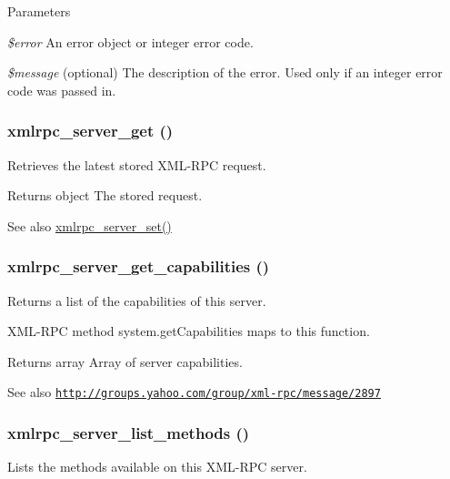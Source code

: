 \begin{DoxyParams}{Parameters}
\item[{\em \$error}]An error object or integer error code. \item[{\em \$message}](optional) The description of the error. Used only if an integer error code was passed in. \end{DoxyParams}
\hypertarget{xmlrpcs_8inc_a368b9f8580aad3b04ad06387e0042b1d}{
\subsubsection[{xmlrpc\_\-server\_\-get}]{\setlength{\rightskip}{0pt plus 5cm}xmlrpc\_\-server\_\-get ()}}
\label{xmlrpcs_8inc_a368b9f8580aad3b04ad06387e0042b1d}
Retrieves the latest stored XML-\/RPC request.

\begin{DoxyReturn}{Returns}
object The stored request.
\end{DoxyReturn}
\begin{DoxySeeAlso}{See also}
\hyperlink{xmlrpcs_8inc_a0797ab88a9029962cd404475d1dfd253}{xmlrpc\_\-server\_\-set()} 
\end{DoxySeeAlso}
\hypertarget{xmlrpcs_8inc_a4763d0e14c3c8eee618d47c8f8d7984f}{
\subsubsection[{xmlrpc\_\-server\_\-get\_\-capabilities}]{\setlength{\rightskip}{0pt plus 5cm}xmlrpc\_\-server\_\-get\_\-capabilities ()}}
\label{xmlrpcs_8inc_a4763d0e14c3c8eee618d47c8f8d7984f}
Returns a list of the capabilities of this server.

XML-\/RPC method system.getCapabilities maps to this function.

\begin{DoxyReturn}{Returns}
array Array of server capabilities.
\end{DoxyReturn}
\begin{DoxySeeAlso}{See also}
\href{http://groups.yahoo.com/group/xml-rpc/message/2897}{\tt http://groups.yahoo.com/group/xml-\/rpc/message/2897} 
\end{DoxySeeAlso}
\hypertarget{xmlrpcs_8inc_a2f1b58cbb48ecb760adc16ca381aa589}{
\subsubsection[{xmlrpc\_\-server\_\-list\_\-methods}]{\setlength{\rightskip}{0pt plus 5cm}xmlrpc\_\-server\_\-list\_\-methods ()}}
\label{xmlrpcs_8inc_a2f1b58cbb48ecb760adc16ca381aa589}
Lists the methods available on this XML-\/RPC server.

